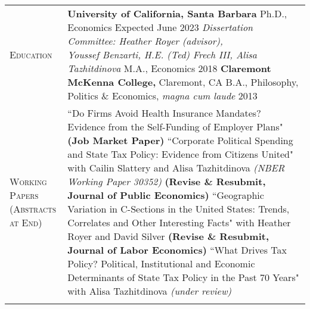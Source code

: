 \documentclass[11pt]{article}
\begin{document}
\begin{tabularx}{\textwidth}{@{}Y Z@{}}
	
	\textsc{Education} &
	\textbf{University of California, Santa Barbara}
	\vspace{3pt} \newline
	\hspace*{15pt} Ph.D., Economics \hfill Expected June 2023%
	\vspace{3pt} \newline
	\hspace*{15pt} \textit{Dissertation Committee: Heather Royer (advisor), \newline \hspace*{15pt} Youssef Benzarti, H.E. (Ted) Frech III, Alisa Tazhitdinova} 
	\vspace{3pt} \newline
	\hspace*{15pt} M.A., Economics \hfill 2018%
	\vspace{10pt} \newline
	\textbf{Claremont McKenna College,} Claremont, CA 
	\vspace{3pt} \newline
	\hspace*{15pt} B.A., Philosophy, Politics \& Economics, \textit{magna cum laude} \hfill 2013%
    \\  \addlinespace[20pt] 

	\textsc{Working \newline Papers} \vspace{10pt} \newline \textsc{(Abstracts \newline at End)} & 
	``Do Firms Avoid Health Insurance Mandates? Evidence from the \newline Self-Funding of Employer Plans"  \textbf{(Job Market Paper)}
	\vspace{10pt} \newline
	``Corporate Political Spending and State Tax Policy: Evidence from Citizens United" \newline with Cailin Slattery and Alisa Tazhitdinova \textit{(NBER Working Paper 30352)} \newline \textbf{(Revise \& Resubmit, Journal of Public Economics)}
	\vspace{10pt} \newline
	``Geographic Variation in C-Sections in the United States: Trends, Correlates \newline and Other Interesting Facts" with Heather Royer and David Silver \newline \textbf{(Revise \& Resubmit, Journal of Labor Economics)}
	\vspace{10pt} \newline
	``What Drives Tax Policy? Political, Institutional and Economic Determinants \newline of State Tax Policy in the Past 70 Years" with Alisa Tazhitdinova \textit{(under review)}
     \\ \addlinespace[10pt] 
    

\end{tabularx}
\end{document}
